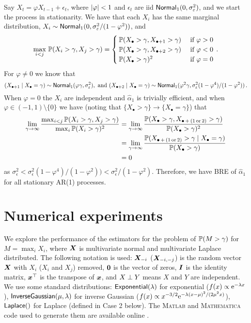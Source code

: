 \begin{example}[AR(1) processes]
Say $X_t = \varphi X_{t-1} + \epsilon_t$, where $\lvert \varphi\rvert < 1$ and $\epsilon_t$ are iid $\mathsf{Normal}_1(0, \sigma_{\varepsilon}^2)$, and we start the process in stationarity. We have that each $X_i$ has the same marginal distribution, $X_i \sim \mathsf{Normal}_1(0, \sigma_{\varepsilon}^2/(1-\varphi^2))$, and
\[
	\max_{i < j} \, \operatorname{{\mathbb P}}(X_i > \gamma, X_j > \gamma) = \begin{cases}
		\operatorname{{\mathbb P}}(X_{\bullet} > \gamma, X_{\bullet+1} > \gamma) & \text{ if } \varphi > 0 \\
		\operatorname{{\mathbb P}}(X_{\bullet} > \gamma, X_{\bullet+2} > \gamma) & \text{ if } \varphi < 0 \\
		\operatorname{{\mathbb P}}(X_{\bullet} > \gamma)^2  & \text{ if } \varphi = 0
	\end{cases} \,.
\]
For $\varphi \not=0$ we know that
\[ (X_{\bullet+1} \mid X_\bullet = \gamma) \sim \mathsf{Normal}_1(\varphi \gamma, \sigma_{\varepsilon}^2), \text{ and } (X_{\bullet+2} \mid X_{\bullet} = \gamma) \sim \mathsf{Normal}_1(\varphi^2 \gamma, \sigma_{\varepsilon}^2 (1-\varphi^4) / (1-\varphi^2)) \,. \]
When $\varphi = 0$ the $X_i$ are independent and $\hat{\alpha}_1$ is trivially efficient, and when $\varphi \in (-1, 1) \setminus \{0\}$ we have (noting that $\{X_\bullet > \gamma\} \to \{X_\bullet = \gamma\}$) that
\begin{align*}
	\lim_{\gamma \to \infty} \frac{ \max_{i < j} \operatorname{{\mathbb P}}(X_i > \gamma, X_j > \gamma) }{ \max_{i} \operatorname{{\mathbb P}}(X_i > \gamma)^2 }
	&= \lim_{\gamma \to \infty} \frac{ \operatorname{{\mathbb P}}(X_{\bullet} > \gamma, X_{\bullet\,+\,(1\,\mathrm{or}\,2)} > \gamma) }{ \operatorname{{\mathbb P}}(X_{\bullet} > \gamma)^2 } \\
	&= \lim_{\gamma \to \infty} \frac{ \operatorname{{\mathbb P}}(X_{\bullet\,+\,(1\,\mathrm{or}\,2)} > \gamma \mid X_{\bullet} = \gamma) }{ \operatorname{{\mathbb P}}(X_{\bullet} > \gamma) } \\
	&= 0
\end{align*}
as $\sigma_{\epsilon}^2 < \sigma_{\epsilon}^2 (1-\varphi^4) / (1-\varphi^2)) < \sigma_{\epsilon}^2/(1-\varphi^2)$. Therefore, we have BRE of $\hat{\alpha}_1$ for all stationary AR(1) processes.
\end{example}

\section{Numerical experiments} \label{scn:numerical_results}

We explore the performance of the estimators for the problem of $\operatorname{{\mathbb P}}(M > \gamma)$ for $M = \max_i X_i$, where $\bm{X}$ is multivariate normal and multivariate Laplace distributed. The following notation is used: $\bm{X}_{-i}$ ($\bm{X}_{-i,-j}$) is the random vector $\bm{X}$ with $X_i$ ($X_i$ and $X_j$) removed, $\bm{0}$ is the vector of zeros, $\bm{I}$ is the identity matrix, $\bm{x}^\top$ is the transpose of $\bm{x}$, and $X \perp Y$ means $X$ and $Y$ are independent. We use some standard distributions: $\mathsf{Exponential}(\lambda)$ for exponential ($f(x)\propto \mathrm{e}^{-\lambda x}$), $\mathsf{InverseGaussian}(\mu,\lambda)$ for inverse Gaussian ($f(x) \propto x^{-3/2} \mathrm{e}^{-\lambda(x-\mu)^2/(2\mu^2x)}$), $\mathsf{Laplace}()$ for Laplace (defined in Case 2 below).
The \textsc{Matlab} and \textsc{Mathematica} code used to generate them are available online \cite{OnlineAccomp}.

